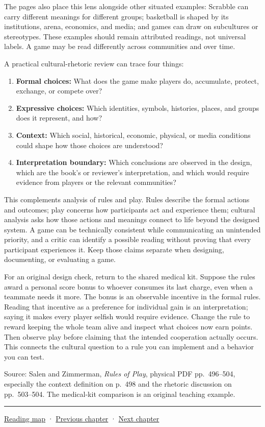 The pages also place this lens alongside other situated examples: Scrabble can carry different meanings for different groups; basketball is shaped by its institutions, arena, economics, and media; and games can draw on subcultures or stereotypes. These examples should remain attributed readings, not universal labels. A game may be read differently across communities and over time.

A practical cultural-rhetoric review can trace four things:

\begin{enumerate}
\def\labelenumi{\arabic{enumi}.}
\tightlist
\item
  \textbf{Formal choices:} What does the game make players do, accumulate, protect, exchange, or compete over?
\item
  \textbf{Expressive choices:} Which identities, symbols, histories, places, and groups does it represent, and how?
\item
  \textbf{Context:} Which social, historical, economic, physical, or media conditions could shape how those choices are understood?
\item
  \textbf{Interpretation boundary:} Which conclusions are observed in the design, which are the book's or reviewer's interpretation, and which would require evidence from players or the relevant communities?
\end{enumerate}

This complements analysis of rules and play. Rules describe the formal actions and outcomes; play concerns how participants act and experience them; cultural analysis asks how those actions and meanings connect to life beyond the designed system. A game can be technically consistent while communicating an unintended priority, and a critic can identify a possible reading without proving that every participant experiences it. Keep those claims separate when designing, documenting, or evaluating a game.

For an original design check, return to the shared medical kit. Suppose the rules award a personal score bonus to whoever consumes its last charge, even when a teammate needs it more. The bonus is an observable incentive in the formal rules. Reading that incentive as a preference for individual gain is an interpretation; saying it makes every player selfish would require evidence. Change the rule to reward keeping the whole team alive and inspect what choices now earn points. Then observe play before claiming that the intended cooperation actually occurs. This connects the cultural question to a rule you can implement and a behavior you can test.

Source: Salen and Zimmerman, \emph{Rules of Play}, physical PDF pp.~496--504, especially the context definition on p.~498 and the rhetoric discussion on pp.~503--504. The medical-kit comparison is an original teaching example.

\begin{center}\rule{0.5\linewidth}{0.5pt}\end{center}

\hyperref[volume-reading-map]{Reading map} · \hyperref[05-engine-i-ch008-algorithms-application-boundaries-and-a-first-playable]{Previous chapter} · \hyperref[05-engine-i-ch010-engine-changes-across-subsystem-contracts]{Next chapter}
